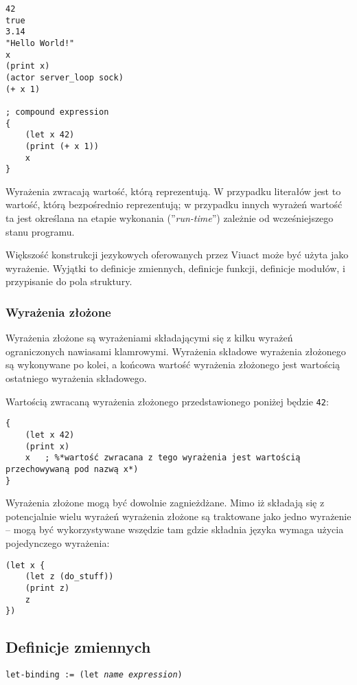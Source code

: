 \documentclass[11pt,oneside,a4paper,titlepage,onecolumn]{article}
\begin{document}
\begin{lstlisting}
42
true
3.14
"Hello World!"
x
(print x)
(actor server_loop sock)
(+ x 1)

; compound expression
{
    (let x 42)
    (print (+ x 1))
    x
}
\end{lstlisting}

Wyrażenia zwracają wartość, którą reprezentują. W przypadku literałów jest to wartość, którą bezpośrednio
reprezentują; w przypadku innych wyrażeń wartość ta jest określana na etapie wykonania (''\emph{run-time}'')
zależnie od wcześniejszego stanu programu.

Większość konstrukcji jezykowych oferowanych przez Viuact może być użyta jako wyrażenie.
Wyjątki to definicje zmiennych, definicje funkcji, definicje modułów, i przypisanie do pola struktury.

\subsubsection{Wyrażenia złożone}

Wyrażenia złożone są wyrażeniami składającymi się z kilku wyrażeń ograniczonych nawiasami klamrowymi.
Wyrażenia składowe wyrażenia złożonego są wykonywane po kolei, a końcowa wartość wyrażenia złożonego jest
wartością ostatniego wyrażenia składowego.

Wartością zwracaną wyrażenia złożonego przedstawionego poniżej będzie \texttt{42}:

\begin{lstlisting}
{
    (let x 42)
    (print x)
    x   ; %*wartość zwracana z tego wyrażenia jest wartością przechowywaną pod nazwą x*)
}
\end{lstlisting}

Wyrażenia złożone mogą być dowolnie zagnieżdżane. Mimo iż składają się z potencjalnie wielu wyrażeń
wyrażenia złożone są traktowane jako jedno wyrażenie -- mogą być wykorzystywane wszędzie tam gdzie składnia
języka wymaga użycia pojedynczego wyrażenia:

\begin{lstlisting}
(let x {
    (let z (do_stuff))
    (print z)
    z
})
\end{lstlisting}

\subsection{Definicje zmiennych}

\texttt{let-binding := (let \emph{name} \emph{expression})}
\end{document}
